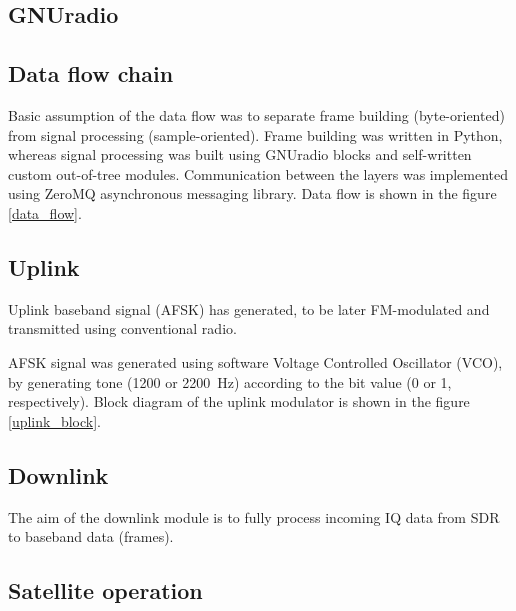 \subsection{GNUradio}

\subsection{Data flow chain}
Basic assumption of the data flow was to separate frame building (byte-oriented) from signal processing (sample-oriented). Frame building was written in Python, whereas signal processing was built using GNUradio blocks and self-written custom out-of-tree modules. Communication between the layers was implemented using ZeroMQ asynchronous messaging library. Data flow is shown in the figure \ref{data_flow}.



\subsection{Uplink}
Uplink baseband signal (AFSK) has generated, to be later FM-modulated and transmitted using conventional radio.

AFSK signal was generated using software Voltage Controlled Oscillator (VCO), by generating tone (\si{1200} or \SI{2200}{\hertz}) according to the bit value (\si{0} or \si{1}, respectively).  Block diagram of the uplink modulator is shown in the figure \ref{uplink_block}.


\subsection{Downlink}
The aim of the downlink module is to fully process incoming IQ data from SDR to baseband data (frames).




\subsection{Satellite operation}

